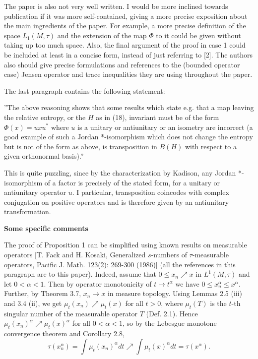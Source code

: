 \documentclass[12pt]{article}
\begin{document}
The paper is also not very well written. I would be more inclined towards publication if
it was more self-contained, giving a more precise exposition about the main ingredients of
the paper. For example, a more precise definition of the space $L_1(M,\tau)$ and the
extension of the map $\Phi$ to it could be given  without taking up too much space. Also,
the final argument of the proof in case 1 could be included at least in a concise form,
instead of just referring to [2]. The authors also should give precise formulations and 
references to the (bounded operator case) Jensen operator and trace inequalities they are
using throughout the paper. 

The last paragraph contains the following statement:

''The above reasoning shows that some results which
state e.g. that a map leaving the relative entropy, or the $H$ as in (18),
invariant must be of the form $\Phi(x) = uxu^*$ where $u$ is a unitary or
antiunitary or an isometry are incorrect (a good example of such a
Jordan *-isomorphism which does not change the entropy but is not
of the form as above, is transposition in $B(H)$ with respect to a given
orthonormal basis).''

This is quite puzzling, since by the characterization by Kadison, any Jordan *-isomorphism
of a factor is precisely of the stated form, for a unitary or antiunitary operator $u$. I
particular, transposition coincodes with complex conjugation on positive operators and is
therefore given by an antiunitary transformation. 


\medskip

\noindent
\textbf{Some specific comments}

The proof of Proposition 1 can be simplified using known results on measurable operators
[T. Fack and H. Kosaki, Generalized $s$-numbers of $\tau$-measurable operators, Pacific J.
Math. 123(2): 269-300 (1986)] (all the references in this paragraph are to this paper). 
Indeed, assume that $0\le x_n\nearrow x$ in $L^1(M, \tau)$ and let $0<\alpha<1$. Then by operator monotonicity
of $t\mapsto t^\alpha$ we have $0\le x_n^\alpha\le x^\alpha$.
Further, by Theorem 3.7, $x_n\to x$ in measure topology. Using Lemmas 2.5
(iii) and 3.4 (ii), we get $\mu_t(x_n)\nearrow \mu_t(x)$ for all
$t>0$, where $\mu_t(T)$ is the $t$-th singular number of the measurable operator $T$ (Def.
2.1). Hence $\mu_t(x_n)^\alpha\nearrow \mu_t(x)^\alpha$ for all $0<\alpha<1$, so by the
Lebesgue monotone convergence theorem and Corollary 2.8, 
\[
\tau(x_n^\alpha)= \int \mu_t(x_n)^\alpha dt\nearrow \int \mu_t(x)^\alpha dt = \tau(x^\alpha).
\]
\end{document}
